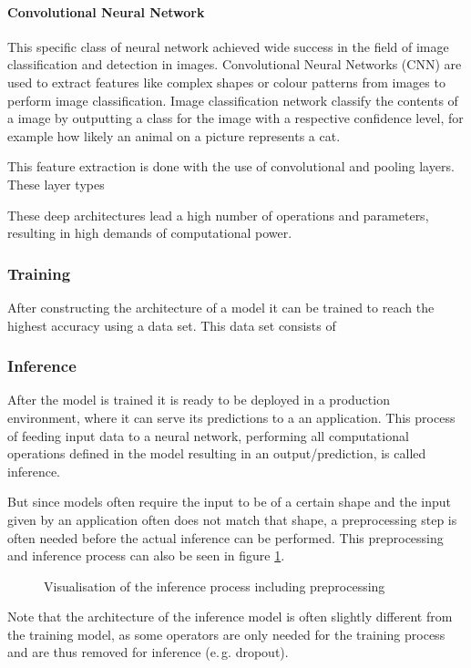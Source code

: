 \paragraph{Convolutional Neural Network}
This specific class of neural network achieved wide success in the field of image classification and detection in images. Convolutional Neural Networks (CNN) are used to extract features like complex shapes or colour patterns from images to perform image classification. Image classification network classify the contents of a image by outputting a class for the image with a respective confidence level, for example how likely an animal on a picture represents a cat.

This feature extraction is done with the use of convolutional and pooling layers. These layer types



These deep architectures lead a high number of operations and parameters, resulting in high demands of computational power.
\subsubsection{Training}
After constructing the architecture of a model it can be trained to reach the highest accuracy using a data set. This data set consists of 
\subsubsection{Inference}

After the model is trained it is ready to be deployed in a production environment, where it can serve its predictions to a an application. This process of feeding input data to a neural network, performing all computational operations defined in the model resulting in an output/prediction, is called inference.

But since models often require the input to be of a certain shape and the input given by an application often does not match that shape, a preprocessing step is often needed before the actual inference can be performed.
This preprocessing and inference process can also be seen in figure \ref{fig:InfProcess}.
\begin{figure}[H]
\centering

\caption{Visualisation of the inference process including preprocessing}
\label{fig:InfProcess}
\end{figure}
Note that the architecture of the inference model is often slightly different from the training model, as some operators are only needed for the training process and are thus removed for inference (e.\,g. dropout).






